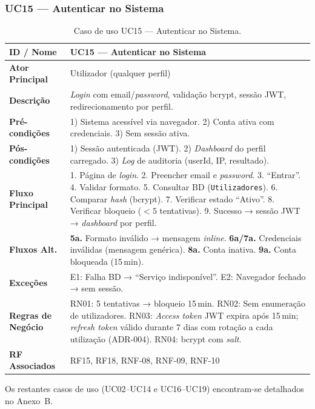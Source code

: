 \subsubsection{UC15 --- Autenticar no Sistema}

\begin{table}[H]
\centering\small
\begin{tabular}{|p{3cm}|p{11cm}|}
\hline
\textbf{ID / Nome} & UC15 --- Autenticar no Sistema \\
\hline
\textbf{Ator Principal} & Utilizador (qualquer perfil) \\
\hline
\textbf{Descrição} & \textit{Login} com email/\textit{password}, validação bcrypt, sessão JWT, redirecionamento por perfil. \\
\hline
\textbf{Pré-condições} & 1) Sistema acessível via navegador. 2) Conta ativa com credenciais. 3) Sem sessão ativa. \\
\hline
\textbf{Pós-condições} & 1) Sessão autenticada (JWT). 2) \textit{Dashboard} do perfil carregado. 3) \textit{Log} de auditoria (userId, IP, resultado). \\
\hline
\textbf{Fluxo Principal} & 1. Página de \textit{login}. 2. Preencher email e \textit{password}. 3. ``Entrar''. 4. Validar formato. 5. Consultar BD (\texttt{Utilizadores}). 6. Comparar \textit{hash} (bcrypt). 7. Verificar estado ``Ativo''. 8. Verificar bloqueio ($< 5$ tentativas). 9. Sucesso → sessão JWT → \textit{dashboard} por perfil. \\
\hline
\textbf{Fluxos Alt.} & \textbf{5a.} Formato inválido → mensagem \textit{inline}. \textbf{6a/7a.} Credenciais inválidas (mensagem genérica). \textbf{8a.} Conta inativa. \textbf{9a.} Conta bloqueada (15\,min). \\
\hline
\textbf{Exceções} & E1: Falha BD → ``Serviço indisponível''. E2: Navegador fechado → sem sessão. \\
\hline
\textbf{Regras de Negócio} & RN01: 5 tentativas → bloqueio 15\,min. RN02: Sem enumeração de utilizadores. RN03: \textit{Access token} JWT expira após 15\,min; \textit{refresh token} válido durante 7 dias com rotação a cada utilização (ADR-004). RN04: bcrypt com \textit{salt}. \\
\hline
\textbf{RF Associados} & RF15, RF18, RNF-08, RNF-09, RNF-10 \\
\hline
\end{tabular}
\caption{Caso de uso UC15 --- Autenticar no Sistema.}
\end{table}

Os restantes casos de uso (UC02--UC14 e UC16--UC19) encontram-se detalhados no Anexo~B.

